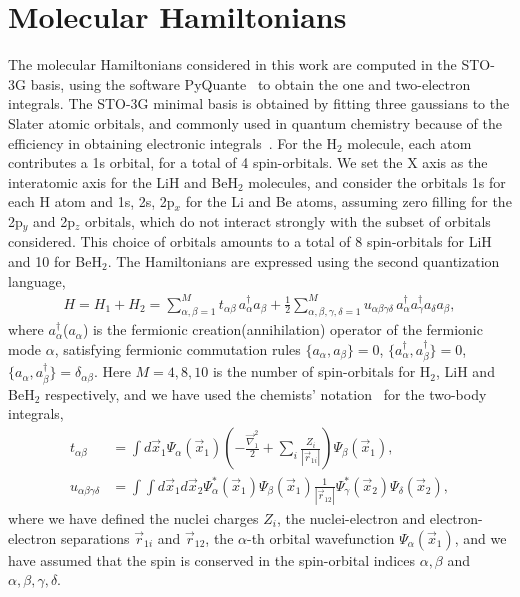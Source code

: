 \documentclass[twocolumn]{revtex4-1}
\newcommand{\1}{\mathbbm{1}}
\begin{document}
\section{Molecular Hamiltonians\label{HamDerivation}}

The molecular Hamiltonians considered in this work are computed in the STO-3G basis, using the software PyQuante~\cite{PyQuanteS} to obtain the one and two-electron integrals. The STO-3G minimal basis is obtained by fitting three gaussians to the Slater atomic orbitals, and commonly used in quantum chemistry because of the efficiency in obtaining electronic integrals~\cite{szabo1989modernS}. For the H$_2$ molecule, each atom contributes a 1s orbital, for a total of 4 spin-orbitals. We set the X axis as the interatomic axis for the LiH and BeH$_2$ molecules, and consider the orbitals 1s for each H atom and 1s, 2s, 2p$_x$ for the Li and Be atoms, assuming zero filling for the 2p$_y$ and 2p$_z$ orbitals, which do not interact strongly with the subset of orbitals considered. This choice of orbitals amounts to a total of 8 spin-orbitals for LiH and 10 for BeH$_2$. The Hamiltonians are expressed using the second quantization language,
\begin{align}
\label{Htgt}
H =H_1+H_2=\sum_{\alpha, \beta=1}^M t_{\alpha \beta} \, a^\dag_{\alpha} a_{\beta} +\frac{1}{2}  \sum_{\alpha, \beta, \gamma, \delta = 1}^M u_{\alpha \beta \gamma \delta}\, a^\dag_{\alpha} a^\dag_{\gamma} a_{\delta} a_{\beta},
\end{align}
where $a^\dag_\alpha$($a_\alpha$) is the fermionic creation(annihilation) operator of the fermionic mode $\alpha$, satisfying fermionic commutation rules $\{a_\alpha,a_\beta\}=0$, $\{a^\dag_\alpha,a^\dag_\beta\}=0$, $\{a_\alpha, a^\dag_\beta\}=\delta_{\alpha\beta}$. Here $M=4,8,10$ is the number of spin-orbitals for H$_2$, LiH and BeH$_2$ respectively, and we have used the chemists' notation~\cite{szabo1989modernS} for the two-body integrals,
\begin{align}
t_{\alpha\beta}&=\int d\vec x_1\Psi_\alpha(\vec{x}_1) \left(-\frac{\vec\nabla_1^2}{2}+\sum_{i} \frac{Z_i}{|\vec{r}_{1i}|}\right)\Psi_\beta (\vec{x}_1),\\
u_{\alpha\beta\gamma\delta}&=\int\int d \vec{x}_1 d \vec{x}_2 \Psi_\alpha^*(\vec{x}_1)\Psi_\beta(\vec{x}_1)\frac{1}{|\vec{r}_{12}|}\Psi_\gamma^*(\vec{x}_2)\Psi_\delta(\vec{x}_2),
\end{align}
where we have defined the nuclei charges $Z_i$, the nuclei-electron and electron-electron separations $\vec{r}_{1i}$ and $\vec{r}_{12}$, the $\alpha$-th orbital wavefunction $\Psi_\alpha(\vec{x}_1)$, and we have assumed that the spin is conserved in the spin-orbital indices $\alpha,\beta$ and $\alpha,\beta,\gamma,\delta$.
\end{document}
